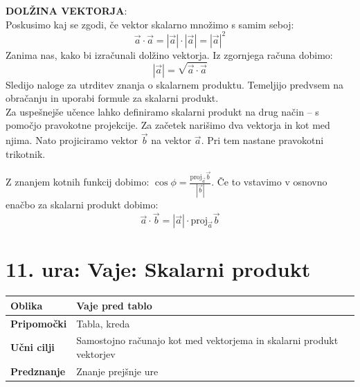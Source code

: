 \documentclass[a4paper,11pt]{article}
\begin{document}
\textbf{DOLŽINA VEKTORJA}:\\
Poskusimo kaj se zgodi, če vektor skalarno množimo s samim seboj: $$\vec{a}\cdot\vec{a}=|\vec{a}|\cdot|\vec{a}|=|\vec{a}|^2$$ Zanima nas, kako bi izračunali dolžino vektorja. Iz zgornjega računa dobimo:
$$|\vec{a}|=\sqrt{\vec{a}\cdot\vec{a}}$$
Sledijo naloge za utrditev znanja o skalarnem produktu. Temeljijo predvsem na obračanju in uporabi formule za skalarni produkt. \\
Za uspešnejše učence lahko definiramo skalarni produkt na drug način -- s pomočjo pravokotne projekcije. 
Za začetek narišimo dva vektorja in kot med njima. Nato projiciramo vektor $\vec{b}$ na vektor $\vec{a}$. Pri tem nastane pravokotni trikotnik.
\begin{center}
\end{center}
Z znanjem kotnih funkcij dobimo: $\cos\phi=\frac{\mathrm{proj}_{\vec a}\vec b}{|\vec{b}|}$. Če to vstavimo v osnovno enačbo za skalarni produkt dobimo:
$$\vec{a}\cdot\vec{b}=|\vec{a}|\cdot\mathrm{proj}_{\vec a}\vec b$$
\newpage
\section{11. ura: Vaje: Skalarni produkt}
\begin{tabularx}{\textwidth}{|>{\bfseries\RaggedRight}p{2.7cm}|X|}
\hline
Oblika & Vaje pred tablo \\ \hline
Pripomočki & Tabla, kreda \\ \hline
Učni cilji & Samostojno računajo kot med vektorjema in skalarni produkt vektorjev \\ \hline
Predznanje & Znanje prejšnje ure \\ \hline

\end{tabularx}
\\
\end{document}
